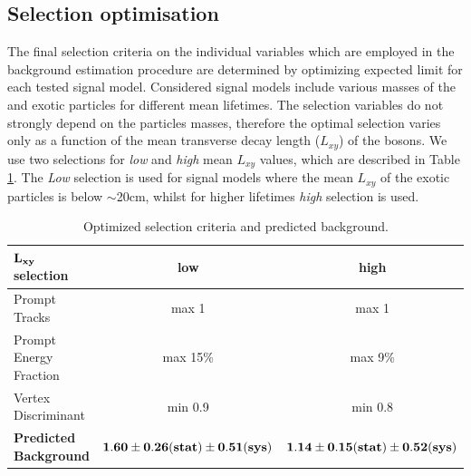 \subsection{Selection optimisation}
\label{subsec:cutvalues}
The final selection criteria on the individual variables which are employed in the background estimation procedure 
are determined by optimizing expected limit for each tested signal model.
Considered signal models include various masses of the \Higgs and \X exotic particles for different
mean lifetimes. 
The selection variables do not strongly depend on the particles masses, therefore the optimal selection
varies only as a function of the mean transverse decay length ($L_{xy}$) of the \X bosons.
We use two selections for {\it low} and {\it high} mean $L_{xy}$ values, which are 
described in Table \ref{tab:background}.
The {\it Low} selection is used for signal models where the mean $L_{xy}$ of the exotic particles
 is below $\sim$20cm, whilst for higher lifetimes {\it high} selection is used.   

\begin{table}[htbp]
\centering
\begin{tabular}{lcc}
\hline
$\bf L_{xy}$ \bf selection & \bf low & \bf high \\
\hline
Prompt Tracks & max 1 & max 1 \\ 
Prompt Energy Fraction & max 15\% & max 9\% \\
Vertex Discriminant & min 0.9 & min 0.8  \\
\hline
\bf Predicted Background & $\bf 1.60\pm0.26(stat)\pm0.51(sys)$ & $\bf 1.14\pm0.15(stat)\pm0.52(sys)$ \\
\hline
\end{tabular}
\caption{Optimized selection criteria and predicted background.\label{tab:background}}
\end{table}  


